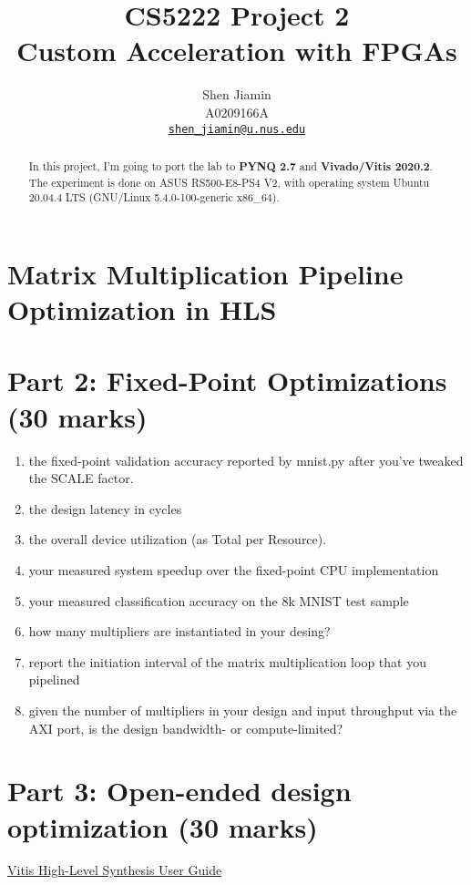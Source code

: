 \documentclass{article}
\begin{document}
\title{\bfseries
  CS5222 Project 2 \\
  Custom Acceleration with FPGAs\\
}

\author{
  Shen Jiamin \\
  A0209166A \\
  \href{mailto:shen_jiamin@u.nus.edu}{\nolinkurl{shen_jiamin@u.nus.edu}}
}

\maketitle

\begin{abstract}
  In this project, I'm going to port the lab to \textbf{PYNQ 2.7} and \textbf{Vivado/Vitis 2020.2}.
  The experiment is done on ASUS RS500-E8-PS4 V2, with operating system
  Ubuntu 20.04.4 LTS (GNU/Linux 5.4.0-100-generic x86\_64).
\end{abstract}


\section{Matrix Multiplication Pipeline Optimization in HLS}








\section{Part 2: Fixed-Point Optimizations (30 marks)}

\begin{enumerate}
  \item the fixed-point validation accuracy reported by mnist.py after you've tweaked the SCALE factor.
  \item the design latency in cycles
  \item the overall device utilization (as Total per Resource).
  \item your measured system speedup over the fixed-point CPU implementation
  \item your measured classification accuracy on the 8k MNIST test sample
  \item how many multipliers are instantiated in your desing?
  \item report the initiation interval of the matrix multiplication loop that you pipelined
  \item given the number of multipliers in your design and input throughput via the AXI port, is the design bandwidth- or compute-limited?
\end{enumerate}

\section{Part 3: Open-ended design optimization (30 marks)}

\href{https://www.xilinx.com/support/documentation/sw_manuals/xilinx2020_2/ug1399-vitis-hls.pdf}{Vitis High-Level Synthesis User Guide}


% 
% 

\clearpage
\appendix
\end{document}
